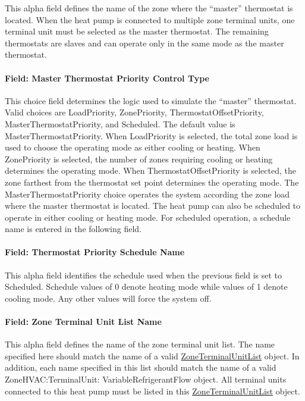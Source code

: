 This alpha field defines the name of the zone where the ``master'' thermostat is located. When the heat pump is connected to multiple zone terminal units, one terminal unit must be selected as the master thermostat. The remaining thermostats are slaves and can operate only in the same mode as the master thermostat.

\paragraph{Field: Master Thermostat Priority Control Type}\label{field-master-thermostat-priority-control-type-000}

This choice field determines the logic used to simulate the ``master'' thermostat. Valid choices are LoadPriority, ZonePriority, ThermostatOffsetPriority, MasterThermostatPriority, and Scheduled. The default value is MasterThermostatPriority. When LoadPriority is selected, the total zone load is used to choose the operating mode as either cooling or heating. When ZonePriority is selected, the number of zones requiring cooling or heating determines the operating mode. When ThermostatOffsetPriority is selected, the zone farthest from the thermostat set point determines the operating mode. The MasterThermostatPriority choice operates the system according the zone load where the master thermostat is located. The heat pump can also be scheduled to operate in either cooling or heating mode. For scheduled operation, a schedule name is entered in the following field.

\paragraph{Field: Thermostat Priority Schedule Name}\label{field-thermostat-priority-schedule-name-000}

This alpha field identifies the schedule used when the previous field is set to Scheduled. Schedule values of 0 denote heating mode while values of 1 denote cooling mode. Any other values will force the system off.

\paragraph{Field: Zone Terminal Unit List Name}\label{field-zone-terminal-unit-list-name}

This alpha field defines the name of the zone terminal unit list. The name specified here should match the name of a valid \hyperref[zoneterminalunitlist]{ZoneTerminalUnitList} object. In addition, each name specified in this list should match the name of a valid ZoneHVAC:TerminalUnit: VariableRefrigerantFlow object. All terminal units connected to this heat pump must be listed in this \hyperref[zoneterminalunitlist]{ZoneTerminalUnitList} object.

